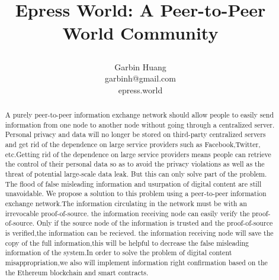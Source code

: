 \documentclass{article}
\title{ \begin{huge}
\textbf{Epress World: A Peer-to-Peer World Community} 
\end{huge} }
\author{ Garbin Huang \\ garbinh@gmail.com \\ epress.world }
\begin{document}
\maketitle
\begin{abstract}
 A purely peer-to-peer information exchange network should allow people to easily send information from one node to another node without going through a centralized server. Personal privacy and data will no longer be  stored on third-party centralized servers and get rid of the dependence on large service providers such as Facebook,Twitter, etc.Getting rid of the dependence on large service providers means people can retrieve the control of their personal data so as to avoid the privacy violations as well as  the threat of potential large-scale data leak. But this can only solve part of the problem. The flood of false misleading 
information and usurpation of digital content are still unavoidable. We propose a solution to this problem using a peer-to-peer information exchange network.The information circulating in the network must be with  an irrevocable proof-of-source. the information receiving node can easily verify the proof-of-source.  Only if the source node of the information is trusted and the proof-of-source is verified,the information can be recieved. the information receiving node will save the copy of the full information,this will be helpful to decrease the false misleading information of the system.In order to solve the problem of digital content misappropriation,we also will implement information right confirmation based on the  the Ethereum blockchain and smart contracts.
\end{abstract}
\end{document}
